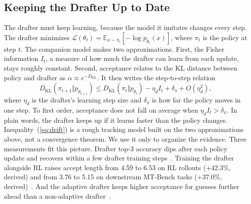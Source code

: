 \documentclass[conference]{IEEEtran}
\begin{document}
\subsection{Keeping the Drafter Up to Date}
\label{sec:model-drift}
The drafter must keep learning, because the model it imitates changes every step. The drafter minimizes $\mathcal{L}(\theta_t)=\mathbb{E}_{x\sim\pi_t}[-\log p_{\theta_t}(x)]$, where $\pi_t$ is the policy at step $t$. The companion model makes two approximations. First, the Fisher information $I_t$, a measure of how much the drafter can learn from each update, stays roughly constant. Second, acceptance relates to the KL distance between policy and drafter as $\alpha\approx e^{-D_{\mathrm{KL}}}$. It then writes the step-to-step relation
\begin{equation}
D_{\mathrm{KL}}(\pi_{t+1}\Vert p_{\theta_{t+1}}) \le D_{\mathrm{KL}}(\pi_t\Vert p_{\theta_t}) - \eta_d I_t + \delta_\pi + O(\eta_d^2),
\label{eq:drift}
\end{equation}
where $\eta_d$ is the drafter's learning step size and $\delta_\pi$ is how far the policy moves in one step. To first order, acceptance does not fall on average when $\eta_d I_t>\delta_\pi$. In plain words, the drafter keeps up if it learns faster than the policy changes. Inequality~(\ref{eq:drift}) is a rough tracking model built on the two approximations above, not a convergence theorem. We use it only to organize the evidence. Three measurements fit this picture. Drafter top-3 accuracy dips after each policy update and recovers within a few drafter training steps~\cite[Fig.~15]{hu2026tlt}. Training the drafter alongside RL raises accept length from 4.59 to 6.53 on RL rollouts (+42.3\%, derived) and from 3.76 to 5.15 on downstream MT-Bench tasks (+37.0\%, derived)~\cite[Table~6]{hu2026tlt}. And the adaptive drafter keeps higher acceptance for guesses further ahead than a non-adaptive drafter~\cite[Fig.~16]{hu2026tlt}.
\end{document}
